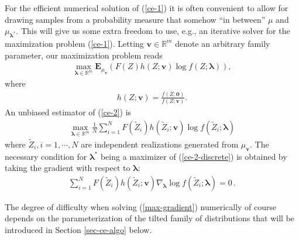 \documentclass[final]{siamltex}
\newcommand{\bR}{{\mathbb R}}
\newcommand{\bE}{{\mathbf E}}
\newcommand{\blambda}{\bm{\lambda}}
\newcommand{\wrt}{with respect to }
\begin{document}
For the efficient numerical solution of (\ref{ce-1}) it is often convenient to allow for drawing samples from a probability measure that  somehow ``in between'' $\mu$ and $\mu_{\blambda^{*}}$. This will give us some extra freedom to use, e.g., an iterative solver for the maximization problem (\ref{ce-1}). Letting $\bm{v}\in \bR^{m}$  denote an arbitrary family parameter, our maximization problem reads 
\begin{align}
  \max_{\blambda \in \mathbb{R}^m} \bE_{\mu_{\bm{v}}} ( F(Z)
  h(Z;\bm{v}) \log f(Z;\blambda)),
  \label{ce-2}
\end{align}
where
\begin{align}
  h(Z;\bm{v}) = \frac{f(Z;\bm{0})}{f(Z;\bm{v})}.
\end{align}
An unbiased estimator of (\ref{ce-2}) is 
\begin{align}
\max_{\blambda \in \mathbb{R}^m} \frac{1}{N} \sum_{i=1}^{N} F(\tilde{Z}_i)
h(\tilde{Z}_i; \bm{v}) \log f(\tilde{Z}_i;\blambda) 
\label{ce-2-discrete}
\end{align}
where $\tilde{Z}_i, i = 1, \cdots, N$ are independent realizations generated from $\mu_{\bm{v}}$. The necessary condition for $\blambda^{*}$ being a maximizer of (\ref{ce-2-discrete}) is obtained by taking the gradient \wrt $\blambda$: 
\begin{align}
\sum_{i=1}^{N} F(\tilde{Z}_i) h(\tilde{Z}_i; \bm{v}) \nabla_{\blambda} \log
  f(\tilde{Z}_i;\blambda) = 0\,.
  \label{max-gradient}
\end{align}

The degree of difficulty when solving (\ref{max-gradient}) numerically of course depends on the parameterization of the tilted family of distributions that will be introduced in Section \ref{sec-ce-algo} below. 




\end{document}
